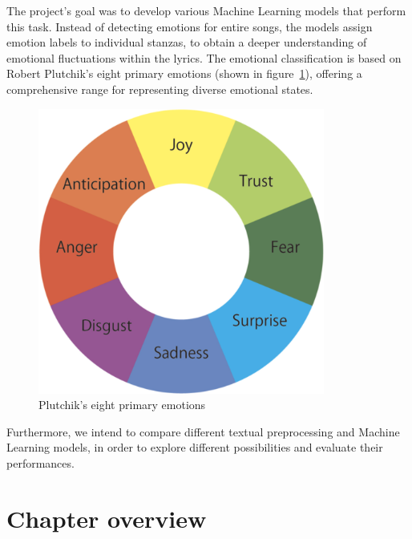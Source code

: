 The project's goal was to develop various Machine Learning models that perform this task.
Instead of detecting emotions for entire songs, the models assign emotion labels
to individual stanzas, to obtain a deeper understanding of
emotional fluctuations within the lyrics.
The emotional classification is based on Robert Plutchik's eight primary emotions
(shown in figure~\ref{fig:primary_emotions}),
offering a comprehensive range for representing diverse emotional states.\\
\begin{figure}[H]
    \centering
    \includegraphics[scale= 0.5]{pictures/plutchik_primary_emotions.png}
    \caption{Plutchik's eight primary emotions}
    \label{fig:primary_emotions}
\end{figure}


Furthermore, we intend to compare different textual preprocessing and
Machine Learning models, in order to explore different possibilities and
evaluate their performances.

\section*{Chapter overview}
